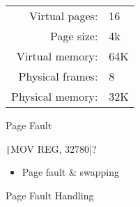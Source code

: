 \begin{frame}
  \begin{varwidth}{.65\textwidth}
    \begin{center}
    \end{center}
    \label{fig:paging}
  \end{varwidth}\hfill
  \begin{varwidth}{.35\textwidth}
    \begin{small}
      \begin{tabular}{rl}
        Virtual pages:  &16\\
        Page size:      &4k\\
        Virtual memory: & 64K\\
        Physical frames:&8\\
        Physical memory:&32K
      \end{tabular}
    \end{small}
  \end{varwidth}
\end{frame}

\begin{frame}[fragile]{Page Fault}
  \begin{varwidth}{.48\textwidth}
    \begin{center}
    \end{center}
  \end{varwidth}\hfill
  \begin{varwidth}{.48\textwidth}
    \texttt|MOV REG, 32780|?
    \begin{itemize}
    \item[\Symbol{➠}] Page fault \& swapping
    \end{itemize}
  \end{varwidth}
\end{frame}

\begin{frame}{Page Fault Handling}
  \begin{center}
  \end{center}
\end{frame}

